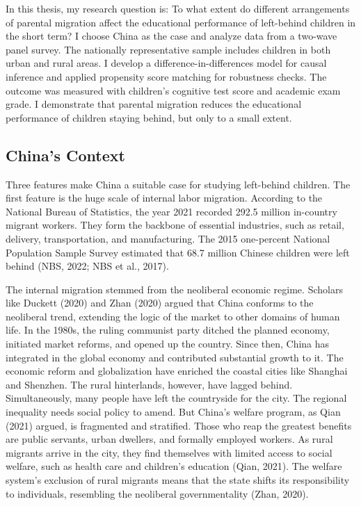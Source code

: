 \documentclass[
  man,floatsintext]{apa7}
\begin{document}
In this thesis, my research question is: To what extent do different arrangements of parental migration affect the educational performance of left-behind children in the short term? I choose China as the case and analyze data from a two-wave panel survey. The nationally representative sample includes children in both urban and rural areas. I develop a difference-in-differences model for causal inference and applied propensity score matching for robustness checks. The outcome was measured with children's cognitive test score and academic exam grade. I demonstrate that parental migration reduces the educational performance of children staying behind, but only to a small extent.

\hypertarget{chinas-context}{%
\subsection{China's Context}\label{chinas-context}}

Three features make China a suitable case for studying left-behind children. The first feature is the huge scale of internal labor migration. According to the National Bureau of Statistics, the year 2021 recorded 292.5 million in-country migrant workers. They form the backbone of essential industries, such as retail, delivery, transportation, and manufacturing. The 2015 one-percent National Population Sample Survey estimated that 68.7 million Chinese children were left behind (NBS, 2022; NBS et al., 2017).

The internal migration stemmed from the neoliberal economic regime. Scholars like Duckett (2020) and Zhan (2020) argued that China conforms to the neoliberal trend, extending the logic of the market to other domains of human life. In the 1980s, the ruling communist party ditched the planned economy, initiated market reforms, and opened up the country. Since then, China has integrated in the global economy and contributed substantial growth to it. The economic reform and globalization have enriched the coastal cities like Shanghai and Shenzhen. The rural hinterlands, however, have lagged behind. Simultaneously, many people have left the countryside for the city. The regional inequality needs social policy to amend. But China's welfare program, as Qian (2021) argued, is fragmented and stratified. Those who reap the greatest benefits are public servants, urban dwellers, and formally employed workers. As rural migrants arrive in the city, they find themselves with limited access to social welfare, such as health care and children's education (Qian, 2021). The welfare system's exclusion of rural migrants means that the state shifts its responsibility to individuals, resembling the neoliberal governmentality (Zhan, 2020).
\end{document}
